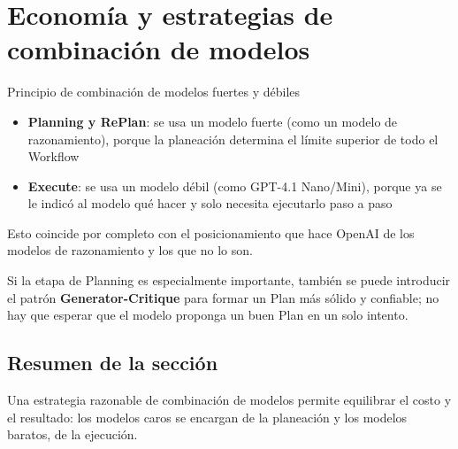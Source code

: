 \section{Economía y estrategias de combinación de modelos}

\begin{importantbox}{Principio de combinación de modelos fuertes y débiles}
\begin{itemize}
    \item \textbf{Planning y RePlan}: se usa un modelo fuerte (como un modelo de razonamiento), porque la planeación determina el límite superior de todo el Workflow
    \item \textbf{Execute}: se usa un modelo débil (como GPT-4.1 Nano/Mini), porque ya se le indicó al modelo qué hacer y solo necesita ejecutarlo paso a paso
\end{itemize}
Esto coincide por completo con el posicionamiento que hace OpenAI de los modelos de razonamiento y los que no lo son.
\end{importantbox}

Si la etapa de Planning es especialmente importante, también se puede introducir el patrón \textbf{Generator-Critique} para formar un Plan más sólido y confiable; no hay que esperar que el modelo proponga un buen Plan en un solo intento.

\subsection{Resumen de la sección}

Una estrategia razonable de combinación de modelos permite equilibrar el costo y el resultado: los modelos caros se encargan de la planeación y los modelos baratos, de la ejecución.

